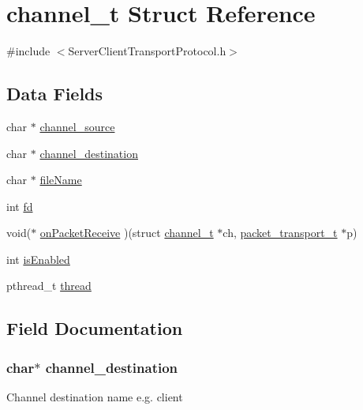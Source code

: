 \hypertarget{structchannel__t}{}\section{channel\+\_\+t Struct Reference}
\label{structchannel__t}


{\ttfamily \#include $<$Server\+Client\+Transport\+Protocol.\+h$>$}

\subsection*{Data Fields}
\begin{DoxyCompactItemize}
\item 
char $\ast$ \hyperlink{structchannel__t_a0a72aa1c901810c34da12df46f40041e}{channel\+\_\+source}
\item 
char $\ast$ \hyperlink{structchannel__t_a459138b7f05f5d080fa284cea148e1ea}{channel\+\_\+destination}
\item 
char $\ast$ \hyperlink{structchannel__t_a25c8761bc1f523fe6a53db546ae83add}{file\+Name}
\item 
int \hyperlink{structchannel__t_a6f8059414f0228f0256115e024eeed4b}{fd}
\item 
void($\ast$ \hyperlink{structchannel__t_a26252193da2aaaaad1a401b6283d7736}{on\+Packet\+Receive} )(struct \hyperlink{structchannel__t}{channel\+\_\+t} $\ast$ch, \hyperlink{structpacket__transport__t}{packet\+\_\+transport\+\_\+t} $\ast$p)
\item 
int \hyperlink{structchannel__t_a5c56d01677044a9e8009acf457aa1a37}{is\+Enabled}
\item 
pthread\+\_\+t \hyperlink{structchannel__t_a01f75a9ad916f63a94e06a27635ba278}{thread}
\end{DoxyCompactItemize}


\subsection{Field Documentation}
\subsubsection[{\texorpdfstring{channel\+\_\+destination}{channel_destination}}]{\setlength{\rightskip}{0pt plus 5cm}char$\ast$ channel\+\_\+destination}\hypertarget{structchannel__t_a459138b7f05f5d080fa284cea148e1ea}{}\label{structchannel__t_a459138b7f05f5d080fa284cea148e1ea}
Channel destination name e.\+g. client 

